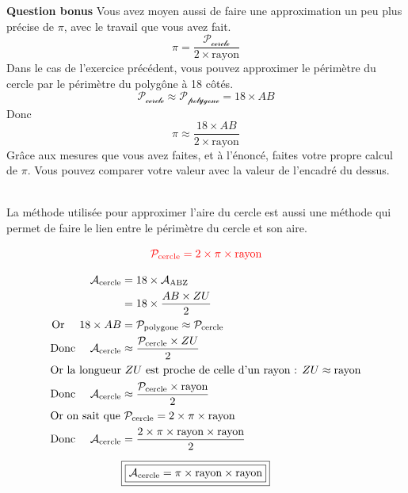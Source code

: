 \documentclass{exam}
\begin{document}
\begin{questions}
  \question \textbf{Question bonus} Vous avez moyen aussi de faire une approximation un peu plus précise de $\pi$, avec le travail que vous avez fait. 
  \[
  \pi = \frac{\mathcal{P_\text{cercle}}}{2 \times \text{rayon}}
  \]
  Dans le cas de l'exercice précédent, vous pouvez approximer le périmètre du cercle par le périmètre du polygône à 18 côtés. 
    \[
  \mathcal{P_\text{cercle}} \approx \mathcal{P_\text{polygone}} = 18 \times AB
  \]
  Donc 
   \[
  \pi \approx \frac{18 \times AB}{2 \times \text{rayon}}
  \]
  Grâce aux mesures que vous avez faites, et à l'énoncé, faites votre propre calcul de $\pi$. Vous pouvez comparer votre valeur avec la valeur de l'encadré du dessus.
\end{questions}

\begin{Indication}

   \\

  La méthode utilisée pour approximer l'aire du cercle est aussi une méthode qui permet de faire le lien entre le périmètre du cercle et son aire. 

  \[
  \color{red}\mathcal{P_\text{cercle}} = 2 \times \pi \times \text{rayon}
\]
  
  
 \begin{align*}
\mathcal{A}_{\text{cercle}}
  &= 18 \times \mathcal{A}_{\text{ABZ}} \\
  &= 18 \times \frac{AB \times ZU}{2} \\
\text{Or } \quad 18 \times AB
  &= \mathcal{P}_{\text{polygone}}
  \approx \mathcal{P}_{\text{cercle}} \\
\text{Donc } \quad
  \mathcal{A}_{\text{cercle}}
  &\approx \frac{\mathcal{P}_{\text{cercle}} \times ZU}{2} \\
\intertext{Or la longueur $ZU$ est proche de celle d'un rayon : $ZU \approx \text{rayon}$}
\text{Donc } \quad
  \mathcal{A}_{\text{cercle}}
  &\approx \frac{\mathcal{P}_{\text{cercle}} \times \text{rayon}}{2} \\
\intertext{Or on sait que $\mathcal{P}_{\text{cercle}} = 2 \times \pi \times \text{rayon}$}
\text{Donc } \quad
\mathcal{A}_{\text{cercle}}
  &= \frac{2 \times \pi \times \text{rayon} \times \text{rayon}}{2} \\[6pt]
&\boxed{\boxed{
\mathcal{A}_{\text{cercle}} = \pi \times \text{rayon} \times \text{rayon}
}}
\end{align*}
\end{Indication}
\end{document}
